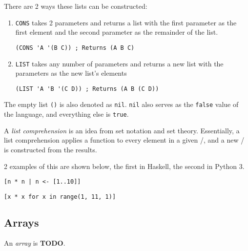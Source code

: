 There are 2 ways these lists can be constructed:
\begin{enumerate}[noitemsep]
\item \texttt{CONS} takes 2 parameters and returns a list with the first parameter as the first element and the second parameter as the remainder of the list.
\begin{verbatim}
(CONS 'A '(B C)) ; Returns (A B C)
\end{verbatim}
\item \texttt{LIST} takes any number of parameters and returns a new list with the parameters as the new list's elements
\begin{verbatim}
(LIST 'A 'B '(C D)) ; Returns (A B (C D))
\end{verbatim}
\end{enumerate}

The empty list \texttt{()} is also denoted as \texttt{nil}.
\texttt{nil} also serves as the \texttt{false} value of the language, and everything else is \texttt{true}.

\begin{definition}\label{def:List_Comprehension}
  A \emph{list comprehension} is an idea from set notation and set theory.
  Essentially, a list comprehension applies a function to every element in a given /, and a new / is constructed from the results.

  2 examples of this are shown below, the first in Haskell, the second in Python 3.
\begin{verbatim}
[n * n | n <- [1..10]]
\end{verbatim}
\begin{verbatim}
[x * x for x in range(1, 11, 1)]
\end{verbatim}
\end{definition}
\subsection{Arrays}\label{subsec:Arrays}
\begin{definition}[Array]\label{def:Array}
  An \emph{array} is \textbf{TODO}.
\end{definition}


